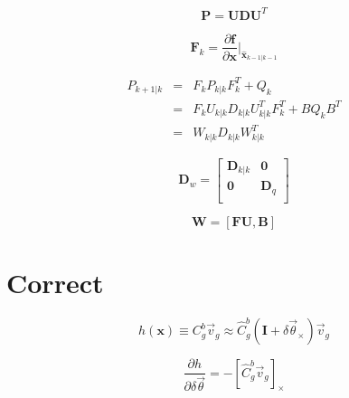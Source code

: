 \documentclass[11pt]{amsart}
\begin{document}
\begin{equation}
  \mathbf{P} = \mathbf{U} \mathbf{D} \mathbf{U}^T
\end{equation}

\begin{equation}
  \mathbf{F}_k = \frac{\partial \mathbf{f}}{\partial \mathbf{x}} \bigg|_{\mathbf{\hat{x}}_{k-1|k-1}}
\end{equation}

\begin{eqnarray}
  P_{k+1|k} &=& F_k P_{k|k} F_k^T + Q_k \\
            &=& F_k U_{k|k} D_{k|k} U_{k|k}^T F_k^T + B Q_k B^T \\
            &=& W_{k|k} D_{k|k} W_{k|k}^T
\end{eqnarray}


\begin{equation}
  \mathbf{D}_w = \begin{bmatrix}
    \mathbf{D}_{k|k} & \mathbf{0} \\
    \mathbf{0}       & \mathbf{D}_q \\
  \end{bmatrix}
\end{equation}

\begin{equation}
  \mathbf{W} = [\mathbf{F} \mathbf{U}, \mathbf{B}]
\end{equation}


\section{Correct}

\begin{equation}
  h(\mathbf{x}) \equiv C_g^b \vec{v}_g
                \approx \hat{C}_g^b (\mathbf{I} + \delta \vec{\theta}_{\times}) \vec{v}_g
\end{equation}

\begin{equation}
  \frac{\partial h}{\partial \delta \vec{\theta}} = -[\hat{C}_g^b \vec{v}_g]_{\times}
\end{equation}
\end{document}
